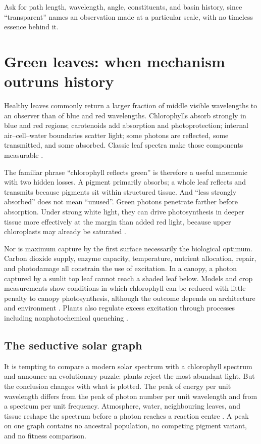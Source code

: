 \begin{decompress}
Ask for path length, wavelength, angle, constituents, and basin history, since ``transparent'' names an observation made at a particular scale, with no timeless essence behind it.
\end{decompress}

\section{Green leaves: when mechanism outruns history}

Healthy leaves commonly return a larger fraction of middle visible wavelengths to an observer than of blue and red wavelengths. Chlorophylls absorb strongly in blue and red regions; carotenoids add absorption and photoprotection; internal air--cell--water boundaries scatter light; some photons are reflected, some transmitted, and some absorbed. Classic leaf spectra make those components measurable \citep{gates1965,woolley1971}.

The familiar phrase ``chlorophyll reflects green'' is therefore a useful mnemonic with two hidden losses. A pigment primarily absorbs; a whole leaf reflects and transmits because pigments sit within structured tissue. And ``less strongly absorbed'' does not mean ``unused''. Green photons penetrate farther before absorption. Under strong white light, they can drive photosynthesis in deeper tissue more effectively at the margin than added red light, because upper chloroplasts may already be saturated \citep{terashima2009,liu2021}.

Nor is maximum capture by the first surface necessarily the biological optimum. Carbon dioxide supply, enzyme capacity, temperature, nutrient allocation, repair, and photodamage all constrain the use of excitation. In a canopy, a photon captured by a sunlit top leaf cannot reach a shaded leaf below. Models and crop measurements show conditions in which chlorophyll can be reduced with little penalty to canopy photosynthesis, although the outcome depends on architecture and environment \citep{walker2018}. Plants also regulate excess excitation through processes including nonphotochemical quenching \citep{ruban2016}.

\subsection{The seductive solar graph}

It is tempting to compare a modern solar spectrum with a chlorophyll spectrum and announce an evolutionary puzzle: plants reject the most abundant light. But the conclusion changes with what is plotted. The peak of energy per unit wavelength differs from the peak of photon number per unit wavelength and from a spectrum per unit frequency. Atmosphere, water, neighbouring leaves, and tissue reshape the spectrum before a photon reaches a reaction centre \citep{kiang2007}. A peak on one graph contains no ancestral population, no competing pigment variant, and no fitness comparison.

